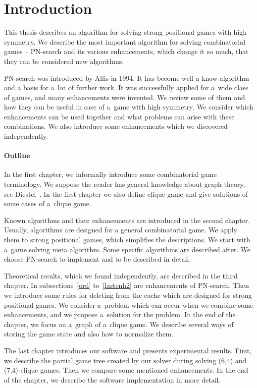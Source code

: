 \chapter*{Introduction}

This thesis describes an algorithm for solving strong positional games
with high symmetry. We describe the most important algorithm for solving 
combinatorial games -- PN-search and its various enhancements, which change
it so much, that they can be considered new algorithms. 

\medskip

PN-search was introduced by Allis in 1994\cite{allis}. It has become well a know algorithm
and a basis for a~lot of further work. It was successfully applied for a~wide class
of games, and many enhancements were invented. We review some of them and how they can be useful
in case of a~game with high symmetry. We consider which  enhancements
can be used together and what problems can arise with these combinations.
We also introduce some enhancements which we discovered independently.

\subsubsection{Outline}

In the first chapter, we informally introduce some combinatorial
game terminology. We suppose the reader has general knowledge about graph theory, 
see Diestel~\cite{ramsey}. In the first chapter we also define clique game and give
solutions of some cases of a~clique game.

Known algorithms and their enhancements are introduced in the second chapter. Usually,
algorithms are designed for a general combinatorial game. We apply them to
strong positional games, which simplifies the descriptions. We start with a~game 
solving meta algorithm. Some specific algorithms are described after. We choose PN-search to
implement and to be described in detail.

Theoretical results, which we found independently, are described in the third chapter.
In subsections~\ref{ord} to~\ref{lastenh2} are enhancements of PN-search. Then we introduce some rules for
deleting from the cache which are designed for strong positional games. We consider
a~problem which can occur when we combine some enhancements, and we
propose a~solution for the problem. In the end of the chapter, we focus on
a~graph of a~clique game. We describe several ways of storing
the game state and also how to normalize them.

The last chapter introduces our software and presents experimental results.
First, we describe the partial game tree created by our solver during solving
(6,4) and (7,4)-clique games. Then we compare some mentioned enhancements. In the 
end of the chapter, we describe the software implementation in more detail.
